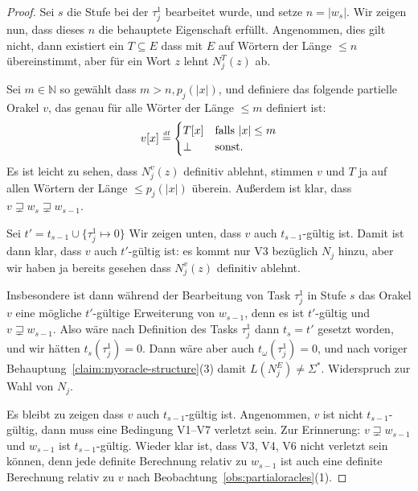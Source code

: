 \begin{proof}
    Sei $s$ die Stufe bei der $\tau^1_j$ bearbeitet wurde, 
    und setze $n=|w_{s}|$.
    Wir zeigen nun, dass dieses $n$ die behauptete Eigenschaft erfüllt.
    Angenommen, dies gilt nicht, dann existiert ein $T\subseteq E$ dass mit $E$ auf Wörtern der Länge $\leq n$ übereinstimmt, aber für ein Wort $z$ lehnt $N_j^T(z)$ ab.

    Sei $m\in\mathbb N$ so gewählt dass $m> n, p_j(|x|)$, und definiere das folgende partielle Orakel $v$, das genau für alle Wörter der Länge $\leq m$ definiert ist:
    \[ v[x] \stackrel{\text{\smash{\tiny df}}}{=} \begin{cases} T[x] & \text{falls $|x|\leq m$} \\ \bot & \text{sonst}. \end{cases}\]
    Es ist leicht zu sehen, dass $N_j^v(z)$ definitiv ablehnt, stimmen $v$ und $T$ ja auf allen Wörtern der Länge $\leq p_j(|x|)$ überein.
    Außerdem ist klar, dass $v\sqsupsetneq w_s \sqsupsetneq w_{s-1}$.

    Sei $t'=t_{s-1}\cup \{\tau^1_j\mapsto 0\}$
    Wir zeigen unten, dass $v$ auch $t_{s-1}$-gültig ist. Damit ist dann klar,
    dass $v$ auch $t'$-gültig ist: es kommt nur V3 bezüglich $N_j$ hinzu, aber wir haben ja bereits gesehen dass $N_j^v(z)$ definitiv ablehnt.

    Insbesondere ist dann während der Bearbeitung von Task $\tau^1_{j}$ in Stufe $s$ das Orakel $v$ eine mögliche $t'$-gültige Erweiterung von $w_{s-1}$, denn es ist $t'$-gültig und $v\sqsupsetneq w_{s-1}$. Also wäre nach Definition des Tasks $\tau^1_{j}$ dann $t_{s}=t'$ gesetzt worden,
    und wir hätten $t_s(\tau^1_j)=0$.
    Dann wäre aber auch $t_\omega(\tau^1_j)=0$, und nach voriger Behauptung~\ref{claim:myoracle-structure}(3) damit $L(N_j^E)\neq\Sigma^*$. Widerspruch zur Wahl von $N_j$.

    Es bleibt zu zeigen dass $v$ auch $t_{s-1}$-gültig ist. Angenommen, $v$ ist nicht $t_{s-1}$-gültig, dann muss eine Bedingung V1–V7 verletzt sein. Zur Erinnerung: $v\sqsupsetneq w_{s-1}$ und $w_{s-1}$ ist $t_{s-1}$-gültig.
    Wieder klar ist, dass V3, V4, V6 nicht verletzt sein können, denn jede definite Berechnung relativ zu $w_{s-1}$ ist auch eine definite Berechnung relativ zu $v$ nach Beobachtung~\ref{obs:partialoracles}(1).


\end{proof}
